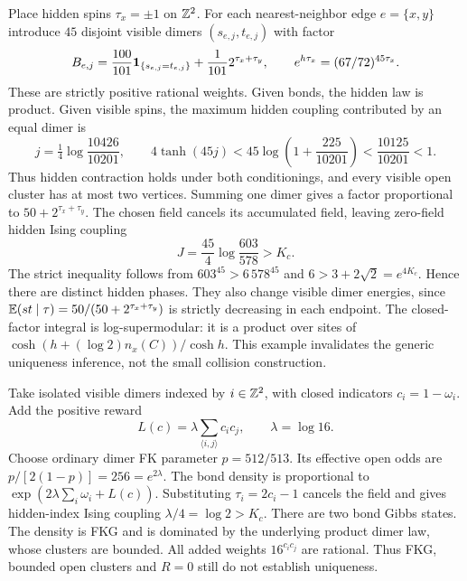 \begin{remark}
Place hidden spins $\tau_x=\pm1$ on $\mathbb Z^2$. For each nearest-neighbor edge $e=\{x,y\}$ introduce $45$ disjoint visible dimers $(s_{e,j},t_{e,j})$ with factor
\[
 B_{e,j}=\frac{100}{101}\mathbf 1_{\{s_{e,j}=t_{e,j}\}}
              +\frac1{101}2^{\tau_x+\tau_y},
 \qquad e^{h\tau_x}=(67/72)^{45\tau_x}.
\]
These are strictly positive rational weights. Given bonds, the hidden law is product. Given visible spins, the maximum hidden coupling contributed by an equal dimer is
\[
 j=\tfrac14\log\frac{10426}{10201},\qquad
 4\tanh(45j)<45\log\left(1+\frac{225}{10201}\right)
 <\frac{10125}{10201}<1.
\]
Thus hidden contraction holds under both conditionings, and every visible open cluster has at most two vertices. Summing one dimer gives a factor proportional to $50+2^{\tau_x+\tau_y}$. The chosen field cancels its accumulated field, leaving zero-field hidden Ising coupling
\[
 J=\frac{45}{4}\log\frac{603}{578}>K_c.
\]
The strict inequality follows from $603^{45}>6\,578^{45}$ and $6>3+2\sqrt2=e^{4K_c}$. Hence there are distinct hidden phases. They also change visible dimer energies, since $\mathbb E(st\mid\tau)=50/(50+2^{\tau_x+\tau_y})$ is strictly decreasing in each endpoint. The closed-factor integral is log-supermodular: it is a product over sites of $\cosh(h+(\log2)n_x(C))/\cosh h$. This example invalidates the generic uniqueness inference, not the small collision construction.
\end{remark}

\begin{remark}
Take isolated visible dimers indexed by $i\in\mathbb Z^2$, with closed indicators $c_i=1-\omega_i$. Add the positive reward
\[
 L(c)=\lambda\sum_{\langle i,j\rangle}c_ic_j,\qquad
 \lambda=\log16.
\]
Choose ordinary dimer FK parameter $p=512/513$. Its effective open odds are $p/[2(1-p)]=256=e^{2\lambda}$. The bond density is proportional to $\exp(2\lambda\sum_i\omega_i+L(c))$. Substituting $\tau_i=2c_i-1$ cancels the field and gives hidden-index Ising coupling $\lambda/4=\log2>K_c$. There are two bond Gibbs states. The density is FKG and is dominated by the underlying product dimer law, whose clusters are bounded. All added weights $16^{c_ic_j}$ are rational. Thus FKG, bounded open clusters and $R=0$ still do not establish uniqueness.
\end{remark}

